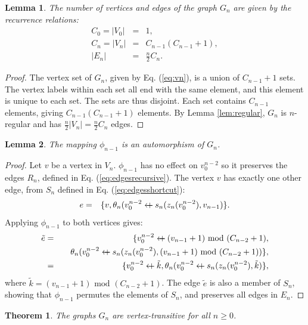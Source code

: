 \documentclass[twocolumn]{article}
\newcommand{\beq}{\begin{eqnarray}}
\newcommand{\eeq}{\end{eqnarray}}
\newcommand{\append}{\leftarrow{\mkern-18mu}{+}\:}
\newtheorem{lemma}{Lemma}
\newtheorem{theorem}{Theorem}
\begin{document}
\begin{lemma}
The number of vertices and edges of the graph $G_n$ are given by the recurrence
relations:
\beq
C_0 = |V_0| &=& 1, \\
\label{eq:cnrec}C_{n} = |V_{n}| &=& C_{n-1} (C_{n-1} + 1), \\
|E_n| &=& \frac{n}{2} C_n.
\eeq
\end{lemma}
\begin{proof}
The vertex set of $G_n$, given by Eq. (\ref{eq:vn}), is a union of
$C_{n-1} + 1$ sets.
The vertex labels within each set all end with the same element,
and this element is unique to each set.
The sets are thus disjoint.
Each set contains $C_{n-1}$ elements, giving $C_{n-1}(C_{n-1} + 1)$
elements.
By Lemma \ref{lem:regular}, $G_n$ is $n$-regular and has
$\frac{n}{2}|V_n| = \frac{n}{2}C_n$ edges.
\end{proof}
\begin{lemma}
\label{lem:phiauto}
The mapping $\phi_{n-1}$ is an automorphism of $G_n$.
\end{lemma}
\begin{proof}
Let $v$ be a vertex in $V_n$.
$\phi_{n-1}$ has no effect on $v_0^{n-2}$ so it preserves the edges $R_n$,
defined in Eq. (\ref{eq:edgesrecursive}).
The vertex $v$ has exactly one other edge, from $S_n$ defined in
Eq. (\ref{eq:edgesshortcut}):
\beq
e &=& \{ v, \theta_n(v_0^{n-2} \append s_n(z_n(v_0^{n-2}), v_{n-1}) \}.
\eeq
Applying $\phi_{n-1}$ to both vertices gives:
\beq
\tilde{e} &=&
\{ v_0^{n-2} \append (v_{n-1} + 1) \mbox{ mod } (C_{n-2} + 1), \\
&& \quad \theta_n(v_0^{n-2} \append
s_n(z_n(v_0^{n-2}), (v_{n-1} + 1) \mbox{ mod } (C_{n-2} + 1) ) \},
\\
&=&
\{ v_0^{n-2} \append \tilde{k},
\theta_n(v_0^{n-2} \append s_n(z_n(v_0^{n-2}), \tilde{k}) \},
\eeq
where $\tilde{k} = (v_{n-1} + 1) \mbox{ mod } (C_{n-2} + 1)$.
The edge $\tilde{e}$ is also a member of $S_n$,
showing that $\phi_{n-1}$ permutes the elements of $S_n$,
and preserves all edges in $E_n$.
\end{proof}
\begin{theorem}
The graphs $G_n$ are vertex-transitive for all $n \geq 0$.
\end{theorem}
\end{document}
